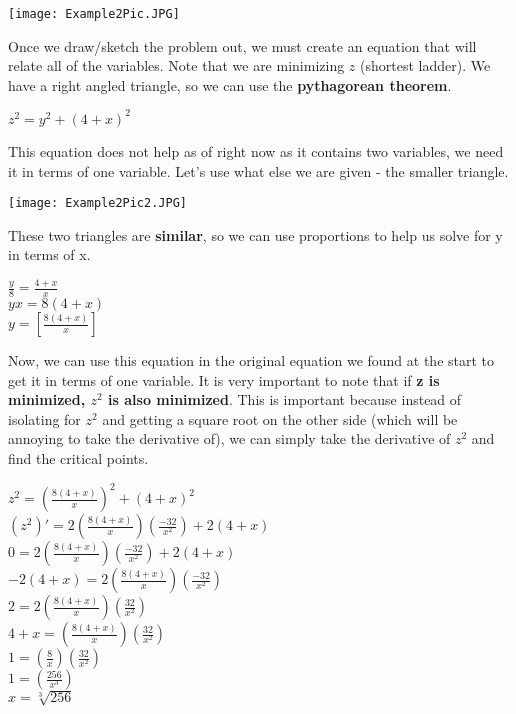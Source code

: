 \documentclass[12pt,fleqn]{book} %
\begin{document}
\pagebreak



\begin{center}
    \texttt{[image: Example2Pic.JPG]}
\end{center}

\noindent Once we draw/sketch the problem out, we must create an equation that will relate all of the variables. Note that we are minimizing $z$ (shortest ladder).
We have a right angled triangle, so we can use the \textbf{pythagorean theorem}.

\begin{center}
    $z^2=y^2+(4+x)^2$
\end{center}

\noindent This equation does not help as of right now as it contains two variables, we need it in terms of one variable. Let's use what else we are given - the smaller triangle.

\begin{center}
    \texttt{[image: Example2Pic2.JPG]}
\end{center}

\noindent These two triangles are \textbf{similar}, so we can use proportions to help us solve for y in terms of x.

\begin{center}
    \large{$\frac{y}{8}=\frac{4+x}{x}$ \\
    $yx = 8(4+x)$ \\
    $y=[\frac{8(4+x)}{x}]$}
\end{center}

\noindent Now, we can use this equation in the original equation we found at the start to get it in terms of one variable. It is very important to note
that if \textbf{z is minimized, $z^2$ is also minimized}. This is important because instead of isolating for $z^2$ and getting a square root on the other
side (which will be annoying to take the derivative of), we can simply take the derivative of $z^2$ and find the critical points.

\begin{center}
    \large{$z^2=(\frac{8(4+x)}{x})^2+(4+x)^2$ \\
        $(z^2)'=2(\frac{8(4+x)}{x})(\frac{-32}{x^2})+2(4+x)$ \\
        $0=2(\frac{8(4+x)}{x})(\frac{-32}{x^2})+2(4+x)$ \\
        $-2(4+x)=2(\frac{8(4+x)}{x})(\frac{-32}{x^2})$ \\
        $2=2(\frac{8(4+x)}{x})(\frac{32}{x^2})$ \\
        $4+x=(\frac{8(4+x)}{x})(\frac{32}{x^2})$ \\
        $1=(\frac{8}{x})(\frac{32}{x^2})$ \\
        $1=(\frac{256}{x^3})$ \\
        $x=\sqrt[3]{256}$}
\end{center}
\end{document}
